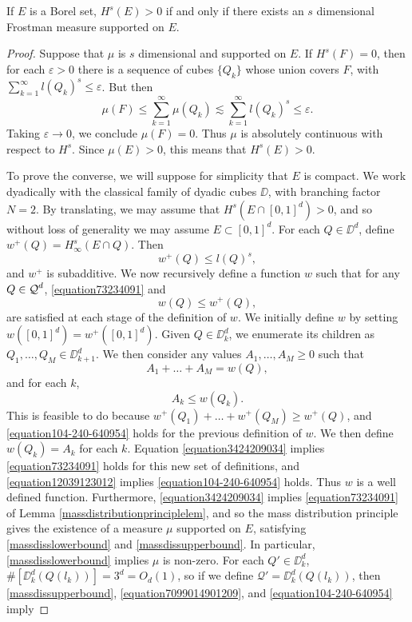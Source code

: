 \begin{theorem}
	If $E$ is a Borel set, $H^s(E) > 0$ if and only if there exists an $s$ dimensional Frostman measure supported on $E$.
\end{theorem}
\begin{proof}
	Suppose that $\mu$ is $s$ dimensional and supported on $E$. If $H^s(F) = 0$, then for each $\varepsilon > 0$ there is a sequence of cubes $\{ Q_k \}$ whose union covers $F$, with $\sum_{k = 1}^\infty l(Q_k)^s \leq \varepsilon$. But then
	\[ \mu(F) \leq \sum_{k = 1}^\infty \mu(Q_k) \lesssim \sum_{k = 1}^\infty l(Q_k)^s \leq \varepsilon. \]
	Taking $\varepsilon \to 0$, we conclude $\mu(F) = 0$. Thus $\mu$ is absolutely continuous with respect to $H^s$. Since $\mu(E) > 0$, this means that $H^s(E) > 0$.

	To prove the converse, we will suppose for simplicity that $E$ is compact. We work dyadically with the classical family of dyadic cubes $\DD$, with branching factor $N = 2$.  By translating, we may assume that $H^s(E \cap [0,1]^d) > 0$, and so without loss of generality we may assume $E \subset [0,1]^d$. For each $Q \in \DD^d$, define $w^+(Q) = H^s_\infty(E \cap Q)$. Then
	\begin{equation} \label{equation7099014901209} w^+(Q) \leq l(Q)^s, \end{equation}
	and $w^+$ is subadditive. We now recursively define a function $w$ such that for any $Q \in \operatorname{\mathcal{Q}}^d$, \eqref{equation73234091} and
	\begin{equation} \label{equation104-240-640954} w(Q) \leq w^+(Q), \end{equation}
	are satisfied at each stage of the definition of $w$. We initially define $w$ by setting $w([0,1]^d) = w^+([0,1]^d)$. Given $Q \in \DD_k^d$, we enumerate its children as $Q_1, \dots, Q_M \in \DD_{k+1}^d$. We then consider any values $A_1, \dots, A_M \geq 0$ such that
  	\begin{equation} \label{equation3424209034}
  		A_1 + \dots + A_M = w(Q),
  	\end{equation}
  	and for each $k$,
  	\begin{equation} \label{equation12039123012}
  		A_k \leq w(Q_k).
  	\end{equation}
	This is feasible to do because $w^+(Q_1) + \dots + w^+(Q_M) \geq w^+(Q)$, and \eqref{equation104-240-640954} holds for the previous definition of $w$. We then define $w(Q_k) = A_k$ for each $k$. Equation \eqref{equation3424209034} implies \eqref{equation73234091} holds for this new set of definitions, and \eqref{equation12039123012} implies \eqref{equation104-240-640954} holds. Thus $w$ is a well defined function. Furthermore, \eqref{equation3424209034} implies \eqref{equation73234091} of Lemma \ref{massdistributionprinciplelem}, and so the mass distribution principle gives the existence of a measure $\mu$ supported on $E$, satisfying \eqref{massdisslowerbound} and \eqref{massdissupperbound}. In particular, \eqref{massdisslowerbound} implies $\mu$ is non-zero. For each $Q' \in \DD_k^d$, $\#[\DD_k^d(Q(l_k))] = 3^d = O_d(1)$, so if we define $\mathcal{Q}' = \DD_k^d(Q(l_k))$, then \eqref{massdissupperbound}, \eqref{equation7099014901209}, and \eqref{equation104-240-640954} imply

\end{proof}
